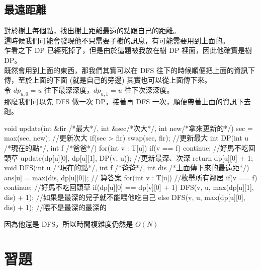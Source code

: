         \subsection{最遠距離}
        對於樹上每個點，找出樹上距離最遠的點跟自己的距離。\\
        這時候我們可能會發現他不只需要子樹的訊息，有可能需要用到上面的。\\
        乍看之下 DP 已經死掉了，但是由於這題被我放在樹 DP 裡面，因此他確實是樹 DP。\\
        既然會用到上面的東西，那我們其實可以在 DFS 往下的時候順便把上面的資訊下傳，至於上面的下面 (就是自己的旁邊) 其實也可以從上面傳下來。\\
        令 $dp_{u, 0} = u$ 往下最深深度，$dp_{u, 1} = u$ 往下次深深度。\\
        那麼我們可以先 DFS 做一次 DP，接著再 DFS 一次，順便帶著上面的資訊下去跑。\\
        \begin{C++}
        void update(int &fir /*最大*/, int &sec/*次大*/, int new/*拿來更新的*/){
            sec = max(sec, new); //更新次大
            if(sec > fir) swap(sec, fir); //更新最大
        }
        int DP(int u /*現在的點*/, int f /*爸爸*/){
            for(int v : T[u]){
                if(v == f) continue; //好馬不吃回頭草
                update(dp[u][0], dp[u][1], DP(v, u)); //更新最深、次深
            }
            return dp[u][0] + 1;
        }
        void DFS(int u /*現在的點*/, int f /*爸爸*/, int dis /*上面傳下來的最遠距*/){
            ans[u] = max(dis, dp[u][0]); // 算答案
            for(int v : T[u]){ //枚舉所有鄰居
                if(v == f) continue; //好馬不吃回頭草
                if(dp[u][0] == dp[v][0] + 1) DFS(v, u, max(dp[u][1], dis) + 1); //如果是最深的兒子就不能喂他吃自己
                else DFS(v, u, max(dp[u][0], dis) + 1); //喂不是最深的最深的
            }
        }
        \end{C++}
        因為他還是 DFS，所以時間複雜度仍然是 $O(N)$
    
    \section{習題}
